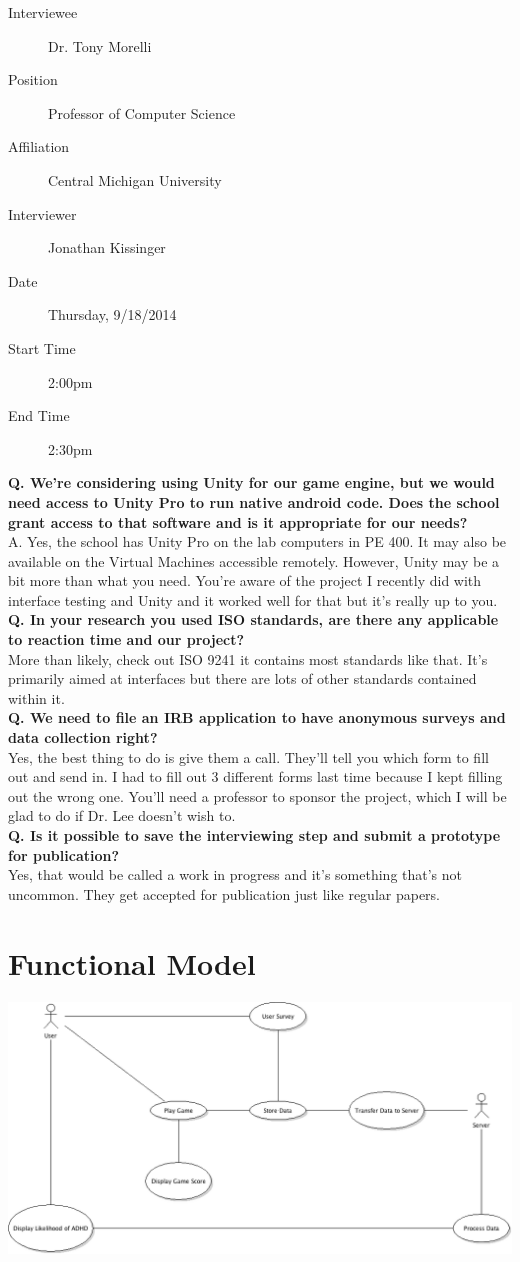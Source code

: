 \documentclass[a4wide]{article}
\begin{document}
\begin{description}
\item[Interviewee] Dr. Tony Morelli
\item[Position] Professor of Computer Science
\item[Affiliation] Central Michigan University
\item[Interviewer] Jonathan Kissinger
\item[Date] Thursday, 9/18/2014
\item[Start Time] 2:00pm
\item[End Time] 2:30pm
\end{description}
\textbf{Q. We're considering using Unity for our game engine, but we would need
access to Unity Pro to run native android code.  Does the school grant access to
that software and is it appropriate for our needs?}\\
A. Yes, the school has Unity Pro on the lab computers in PE 400.  It may also be
available on the Virtual Machines accessible remotely.  However, Unity may be a
bit more than what you need.  You're aware of the project I recently did with
interface testing and Unity and it worked well for that but it's really up to
you.\vspace{2.0 mm}\\
\textbf{Q. In your research you used ISO standards, are there any applicable to
reaction time and our project?}\\
More than likely, check out ISO 9241 it contains most standards like that.  It's
primarily aimed at interfaces but there are lots of other standards contained
within it.\vspace{2.0 mm}\\
\textbf{Q. We need to file an IRB application to have anonymous surveys and data
collection right?}\\
Yes, the best thing to do is give them a call.  They'll tell you which form to
fill out and send in.  I had to fill out 3 different forms last time because I
kept filling out the wrong one.  You'll need a professor to sponsor the project,
which I will be glad to do if Dr. Lee doesn't wish to.\vspace{2.0 mm}\\
\textbf{Q. Is it possible to save the interviewing step and submit a prototype
for publication?}\\
Yes, that would be called a work in progress and it's something that's not
uncommon.  They get accepted for publication just like regular papers.

\section{Functional Model}
\includegraphics[width=\textwidth]{UseCaseDiagram.png}
\end{document}

